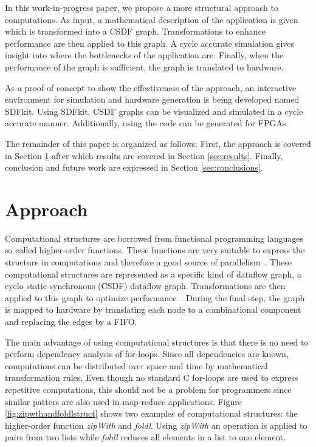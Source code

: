 \documentclass[journal]{IEEEtran}
\begin{document}
  In this work-in-progress paper, we propose a more structural approach to computations.
  As input, a mathematical description of the application is given which is transformed into a CSDF graph.
  Transformations to enhance performance are then applied to this graph.
  A cycle accurate simulation gives insight into where the bottlenecks of the application are.
  Finally, when the performance of the graph is sufficient, the graph is translated to hardware.

  As a proof of concept to show the effectiveness of the approach, an interactive environment for simulation and hardware generation  is being developed named SDFkit.
  Using SDFkit, CSDF graphs can be visualized and simulated in a cycle accurate manner.
  Additionally, using the code can be generated for FPGAs.

  The remainder of this paper is organized as follows:
  First, the approach is covered in Section \ref{sec:approach} after which results are covered in Section \ref{sec:results}.
  Finally, conclusion and future work are expressed in Section \ref{sec:conclusions}.


\section{Approach}
\label{sec:approach}

  Computational structures are borrowed from functional programming languages so called higher-order functions.
  These functions are very suitable to express the structure in computations and therefore a good source of parallelism~\cite{Wester15}.
  These computational structures are represented as a specific kind of dataflow graph, a cyclo static synchronous (CSDF) dataflow graph.
  Transformations are then applied to this graph to optimize performance~\cite{deGroote16}.
  During the final step, the graph is mapped to hardware by translating each node to a combinational component and replacing the edges by a FIFO.

  The main advantage of using computational structures is that there is no need to perform dependency analysis of for-loops.
  Since all dependencies are known, computations can be distributed over space and time by mathematical transformation rules.
  Even though no standard C for-loops are used to express repetitive computations, this should not be a problem for programmers since similar patters are also used in map-reduce applications.
  Figure \ref{fig:zipwthandfoldlstruct} shows two examples of computational structures: the higher-order function \emph{zipWith} and \emph{foldl}.
  Using \emph{zipWith} an operation is applied to pairs from two lists while \emph{foldl} reduces all elements in a list to one element.
\end{document}
